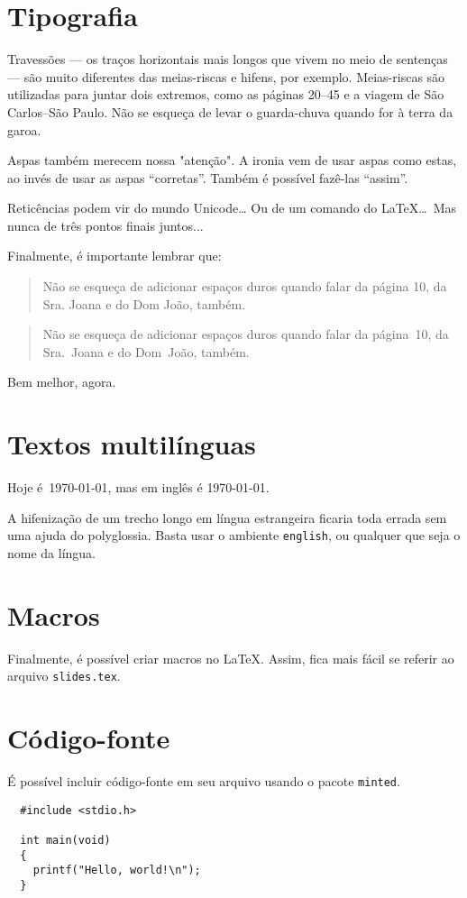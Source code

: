 \documentclass[a4paper,oneside]{article}
\newcommand{\filename}[1]{\texttt{#1}}
\begin{document}
\frenchspacing

\section{Tipografia}

Travessões --- os traços horizontais mais longos que vivem no meio de sentenças
--- são muito diferentes das meias-riscas e hifens, por exemplo. Meias-riscas
são utilizadas para juntar dois extremos, como as páginas 20--45 e a viagem de
São Carlos--São Paulo. Não se esqueça de levar o guarda-chuva quando for à
terra da garoa.

Aspas também merecem nossa "atenção". A ironia vem de usar aspas como estas, ao
invés de usar as aspas “corretas”. Também é possível fazê-las ``assim''.

Reticências podem vir do mundo Unicode… Ou de um comando do \LaTeX\ldots\ Mas
nunca de três pontos finais juntos...

Finalmente, é importante lembrar que:

\begin{quote}
  Não se esqueça de adicionar espaços duros quando falar da página 10, da
  Sra. Joana e do Dom João, também.
\end{quote}

\begin{quote}
  Não se esqueça de adicionar espaços duros quando falar da página~10, da
  Sra.~Joana e do Dom~João, também.
\end{quote}

Bem melhor, agora.

\section{Textos multilínguas}

Hoje é~\today, mas em inglês é \textenglish{\today}.

A hifenização de um trecho longo em língua estrangeira ficaria toda errada sem
uma ajuda do polyglossia. Basta usar o ambiente \verb+english+, ou qualquer que
seja o nome da língua.

\section{Macros}

Finalmente, é possível criar macros no \LaTeX. Assim, fica mais fácil se
referir ao arquivo \filename{slides.tex}.

\section{Código-fonte}

É possível incluir código-fonte em seu arquivo usando o pacote \texttt{minted}.

\begin{verbatim}
  #include <stdio.h>

  int main(void)
  {
    printf("Hello, world!\n");
  }
\end{verbatim}
\end{document}
